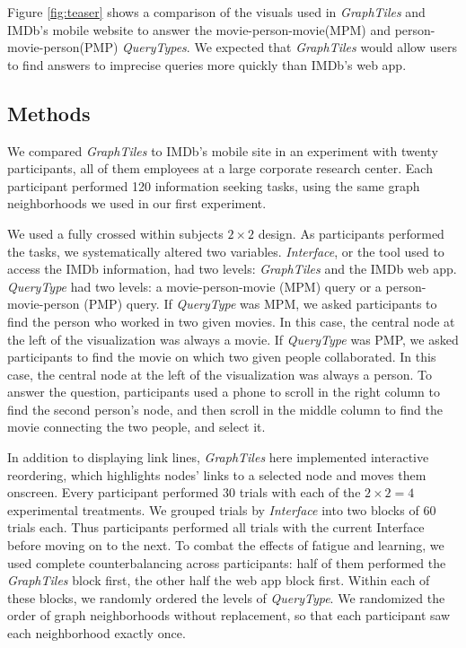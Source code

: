 \documentclass{sigchi}
\begin{document}
Figure \ref{fig:teaser} shows a comparison of the visuals used in \textit{GraphTiles} and IMDb's mobile website to answer the movie-person-movie(MPM) and person-movie-person(PMP) \textit{QueryTypes}. We expected that \textit{GraphTiles} would allow users to find answers to imprecise queries more quickly than IMDb's web app.




\subsection{Methods}

We compared \textit{GraphTiles} to IMDb's mobile site in an experiment with twenty participants, all of them employees at a large corporate research center. Each participant performed 120 information seeking tasks, using the same graph neighborhoods we used in our first experiment.

We used a fully crossed within subjects $2 \times 2$ design. As participants performed the tasks, we systematically altered two variables. \textit{Interface}, or the tool used to access the IMDb information, had two levels: \textit{GraphTiles} and the IMDb web app. \textit{QueryType} had two levels: a movie-person-movie (MPM) query or a person-movie-person (PMP) query. 
 If \textit{QueryType} was MPM, we asked participants to find the person who worked in two given movies. In this case, the central node at the left of the visualization was always a movie. If \textit{QueryType} was PMP, we asked participants to find the movie on which two given people collaborated. In this case, the central node at the left of the visualization was always a person. To answer the question, participants used a phone to scroll in the right column to find the second person's node, and then scroll in the middle column to find the movie connecting the two people, and select it.

In addition to displaying link lines, \textit{GraphTiles} here implemented interactive reordering, which highlights nodes' links to a selected node and moves them onscreen. Every participant performed 30 trials with each of the $2 \times 2 = 4$ experimental treatments. We grouped trials by \textit{Interface} into two blocks of 60 trials each. Thus participants performed all trials with the current Interface before moving on to the next. To combat the effects of fatigue and learning, we used complete counterbalancing across participants: half of them performed the \textit{GraphTiles} block first, the other half the web app block first. Within each of these blocks, we randomly ordered the levels of \textit{QueryType}. We randomized the order of graph neighborhoods without replacement, so that each participant saw each neighborhood exactly once.
\end{document}
